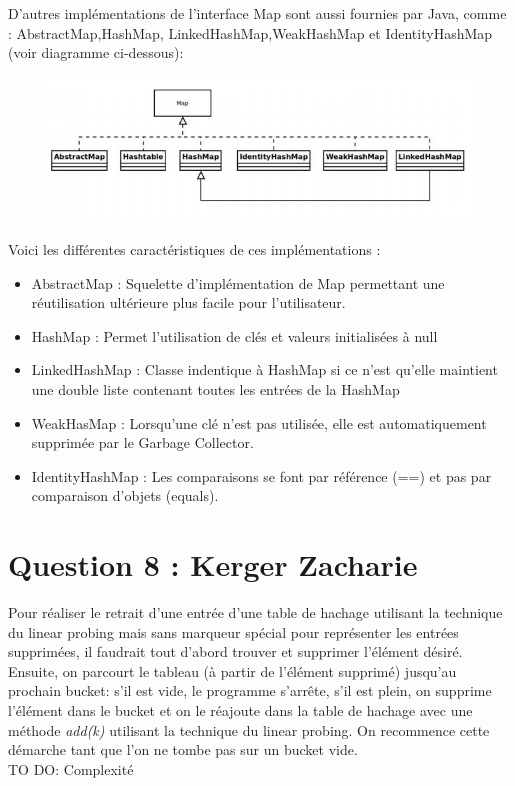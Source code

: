\documentclass[10pt,a4paper]{article}
\begin{document}
D'autres implémentations de l'interface Map sont aussi fournies par Java, comme : AbstractMap,HashMap, LinkedHashMap,WeakHashMap et IdentityHashMap (voir diagramme ci-dessous):
\\
\begin{figure}
\centering
\includegraphics[scale=0.7]{diagramme.jpg}
\end{figure}


Voici les différentes caractéristiques de ces implémentations :
\begin{itemize}
\item AbstractMap : Squelette d'implémentation de Map permettant une réutilisation ultérieure plus facile pour l'utilisateur.
\item HashMap : Permet l'utilisation de clés et valeurs initialisées à null
\item LinkedHashMap : Classe indentique à HashMap si ce n'est qu'elle maintient une double liste contenant toutes les entrées de la HashMap
\item WeakHasMap : Lorsqu'une clé n'est pas utilisée, elle est automatiquement supprimée par le Garbage Collector.
\item IdentityHashMap : Les comparaisons se font par référence (==) et pas par comparaison d'objets (equals).
\end{itemize}

\section*{Question 8 : Kerger Zacharie}

Pour réaliser le retrait d'une entrée d'une table de hachage utilisant la technique du linear probing mais sans marqueur spécial pour représenter les entrées supprimées, il faudrait tout d'abord trouver et supprimer l'élément désiré. Ensuite, on parcourt le tableau (à partir de l'élément supprimé) jusqu'au prochain bucket: s'il est vide, le programme s'arrête, s'il est plein, on supprime l'élément dans le bucket et on le réajoute dans la table de hachage avec une méthode \emph{add(k)} utilisant la technique du linear probing. On recommence cette démarche tant que l'on ne tombe pas sur un bucket vide.\\
\newline
TO DO: Complexité
\end{document}
